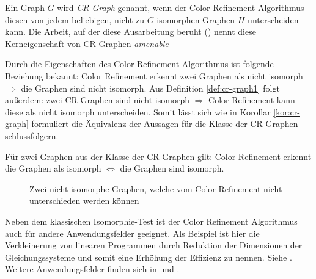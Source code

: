 \begin{Definition}
	Ein Graph $G$ wird \emph{CR-Graph} genannt, wenn der Color Refinement Algorithmus diesen von jedem beliebigen, nicht zu $G$ isomorphen Graphen $H$ unterscheiden kann.
	Die Arbeit, auf der diese Ausarbeitung beruht (\cite{Arvind2015}) nennt diese Kerneigenschaft von CR-Graphen \emph{amenable}
	\label{def:cr-graph1}
\end{Definition}

Durch die Eigenschaften des Color Refinement Algorithmus ist folgende Beziehung bekannt: Color Refinement erkennt zwei Graphen als nicht isomorph $\Rightarrow$ die Graphen sind nicht isomorph.
Aus Definition \ref{def:cr-graph1} folgt außerdem: zwei CR-Graphen sind nicht isomorph $\Rightarrow$ Color Refinement kann diese als nicht isomorph unterscheiden.
Somit lässt sich wie in Korollar \ref{kor:cr-graph} formuliert die Äquivalenz der Aussagen für die Klasse der CR-Graphen schlussfolgern.

\begin{Korollar}
	Für zwei Graphen aus der Klasse der CR-Graphen gilt: Color Refinement erkennt die Graphen als isomorph $\Leftrightarrow$ die Graphen sind isomorph.
	\label{kor:cr-graph}
\end{Korollar}

\begin{figure}[t]
	\centering
	\caption{Zwei nicht isomorphe Graphen, welche vom Color Refinement nicht unterschieden werden können}
	\label{fig:nicht_isomorphe_graphen}
\end{figure}

Neben dem klassischen Isomorphie-Test ist der Color Refinement Algorithmus auch für andere Anwendungsfelder geeignet.
Als Beispiel ist hier die Verkleinerung von linearen Programmen durch Reduktion der Dimensionen der Gleichungssysteme und somit eine Erhöhung der Effizienz zu nennen.
Siehe \cite{Grohe2014}.
Weitere Anwendungsfelder finden sich in \cite{shervashidze2011weisfeiler} und \cite{kersting2014power}.

